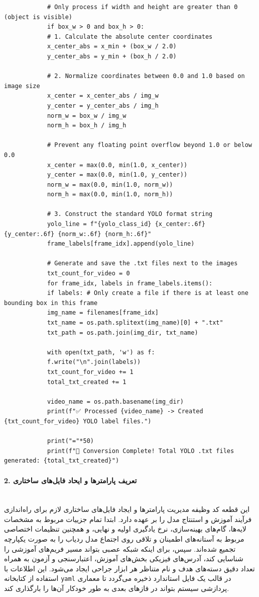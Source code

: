 \documentclass{article}
\begin{document}
\begin{latin}
\begin{LTR}
\begin{verbatim}
			# Only process if width and height are greater than 0 (object is visible)
			if box_w > 0 and box_h > 0:
			# 1. Calculate the absolute center coordinates
			x_center_abs = x_min + (box_w / 2.0)
			y_center_abs = y_min + (box_h / 2.0)
			
			# 2. Normalize coordinates between 0.0 and 1.0 based on image size
			x_center = x_center_abs / img_w
			y_center = y_center_abs / img_h
			norm_w = box_w / img_w
			norm_h = box_h / img_h
			
			# Prevent any floating point overflow beyond 1.0 or below 0.0
			x_center = max(0.0, min(1.0, x_center))
			y_center = max(0.0, min(1.0, y_center))
			norm_w = max(0.0, min(1.0, norm_w))
			norm_h = max(0.0, min(1.0, norm_h))
			
			# 3. Construct the standard YOLO format string
			yolo_line = f"{yolo_class_id} {x_center:.6f} {y_center:.6f} {norm_w:.6f} {norm_h:.6f}"
			frame_labels[frame_idx].append(yolo_line)
			
			# Generate and save the .txt files next to the images
			txt_count_for_video = 0
			for frame_idx, labels in frame_labels.items():
			if labels: # Only create a file if there is at least one bounding box in this frame
			img_name = filenames[frame_idx]
			txt_name = os.path.splitext(img_name)[0] + ".txt"
			txt_path = os.path.join(img_dir, txt_name)
			
			with open(txt_path, 'w') as f:
			f.write("\n".join(labels))
			txt_count_for_video += 1
			total_txt_created += 1
			
			video_name = os.path.basename(img_dir)
			print(f"✅ Processed {video_name} -> Created {txt_count_for_video} YOLO label files.")
			
			print("="*50)
			print(f"🎉 Conversion Complete! Total YOLO .txt files generated: {total_txt_created}")
		\end{verbatim}
	\end{LTR}
\end{latin}

\paragraph{2. تعریف پارامترها و ایحاد فایل‌های ساختاری }\mbox{}\\
این قطعه کد وظیفه مدیریت پارامترها و ایجاد فایل‌های ساختاری لازم برای راه‌اندازی فرآیند آموزش و استنتاج مدل را بر عهده دارد. ابتدا تمام جزییات مربوط به مشخصات لایه‌ها، گام‌های بهینه‌سازی، نرخ یادگیری اولیه و نهایی، و همچنین تنظیمات اختصاصی مربوط به آستانه‌های اطمینان و تلاقی روی اجتماع مدل ردیاب را به صورت یکپارچه تجمیع شده‌اند. سپس، برای اینکه شبکه عصبی بتواند مسیر فریم‌های آموزشی را شناسایی کند، آدرس‌های فیزیکی بخش‌های آموزش، اعتبارسنجی و آزمون به همراه تعداد دقیق دسته‌های هدف و نام متناظر هر ابزار جراحی ایجاد می‌شود. این اطلاعات با استفاده از کتابخانه \texttt{yaml} در قالب یک فایل استاندارد ذخیره می‌گردد تا معماری پردازشی سیستم بتواند در فازهای بعدی به طور خودکار آن‌ها را بارگذاری کند.
\end{document}
